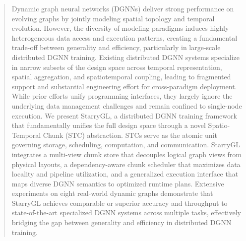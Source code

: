 
\begin{abstract}
Dynamic graph neural networks (DGNNs) deliver strong performance on evolving graphs by jointly modeling spatial topology and temporal evolution. 
However, the diversity of modeling paradigms induces highly heterogeneous data access and execution patterns, creating a fundamental trade-off between generality and efficiency, particularly in large-scale distributed DGNN training. 
Existing distributed DGNN systems specialize in narrow subsets of the design space across temporal representation, spatial aggregation, and spatiotemporal coupling, leading to fragmented support and substantial engineering effort for cross-paradigm deployment. 
While prior efforts unify programming interfaces, they largely ignore the underlying data management challenges and remain confined to single-node execution.
%
We present StarryGL, a distributed DGNN training framework that fundamentally unifies the full design space through a novel Spatio-Temporal Chunk (STC) abstraction. 
STCs serve as the atomic unit governing storage, scheduling, computation, and communication. 
StarryGL integrates a multi-view chunk store that decouples logical graph views from physical layouts, a dependency-aware chunk scheduler that maximizes data locality and pipeline utilization, and a generalized execution interface that maps diverse DGNN semantics to optimized runtime plans.
Extensive experiments on eight real-world dynamic graphs demonstrate that StarryGL achieves comparable or superior accuracy and throughput to state-of-the-art specialized DGNN systems across multiple tasks, effectively bridging the gap between generality and efficiency in distributed DGNN training.
\end{abstract}


